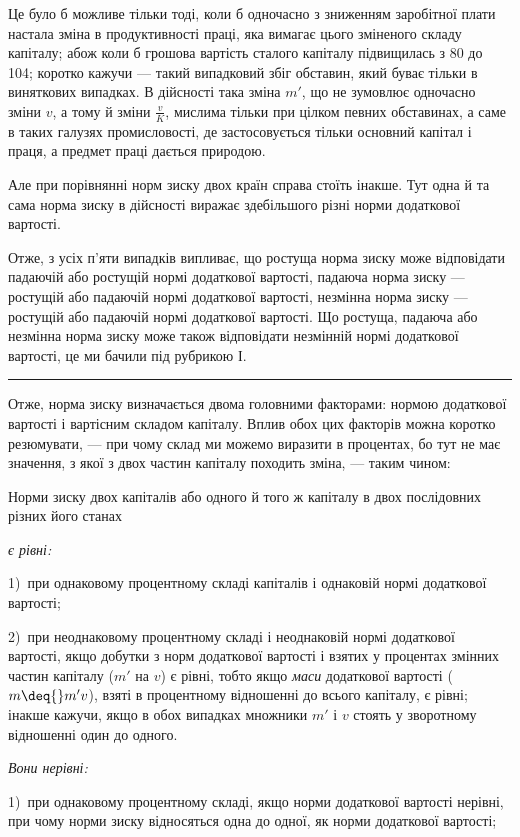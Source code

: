 
Це було б можливе тільки тоді, коли б одночасно з зниженням
заробітної плати настала зміна в продуктивності праці, яка
вимагає цього зміненого складу капіталу; абож коли б грошова вартість
сталого капіталу підвищилась з 80 до 104; коротко кажучи —
такий випадковий збіг обставин, який буває тільки в виняткових
випадках. В дійсності така зміна $m'$, що не зумовлює одночасно
зміни $v$, а тому й зміни $\frac{v}{K}$, мислима тільки при цілком певних
обставинах, а саме в таких галузях промисловості, де застосовується
тільки основний капітал і праця, а предмет праці дається
природою.

Але при порівнянні норм зиску двох країн справа стоїть
інакше. Тут одна й та сама норма зиску в дійсності виражає
здебільшого різні норми додаткової вартості.

Отже, з усіх п’яти випадків випливає, що ростуща норма
зиску може відповідати падаючій або ростущій нормі додаткової
вартості, падаюча норма зиску — ростущій або падаючій
нормі додаткової вартості, незмінна норма зиску — ростущій або
падаючій нормі додаткової вартості. Що ростуща, падаюча або
незмінна норма зиску може також відповідати незмінній нормі
додаткової вартості, це ми бачили під рубрикою І.

\pfbreak

Отже, норма зиску визначається двома головними факторами:
нормою додаткової вартості і вартісним складом капіталу.
Вплив обох цих факторів можна коротко резюмувати, — при чому
склад ми можемо виразити в процентах, бо тут не має значення,
з якої з двох частин капіталу походить зміна, — таким чином:

Норми зиску двох капіталів або одного й того ж капіталу
в двох послідовних різних його станах

\emph{є рівні:}

1)~при однаковому процентному складі капіталів і однаковій
нормі додаткової вартості;

2)~при неоднаковому процентному складі і неоднаковій нормі
додаткової вартості, якщо добутки з норм додаткової вартості
і взятих у процентах змінних частин капіталу ($m'$ на $v$) є рівні,
тобто якщо \emph{маси} додаткової вартості ($m \deq{} m'v$), взяті в процентному
відношенні до всього капіталу, є рівні; інакше кажучи,
якщо в обох випадках множники $m'$ і $v$ стоять у зворотному
відношенні один до одного.

\emph{Вони нерівні:}

1)~при однаковому процентному складі, якщо норми додаткової
вартості нерівні, при чому норми зиску відносяться одна до
одної, як норми додаткової вартості;
\parbreak{}  %
